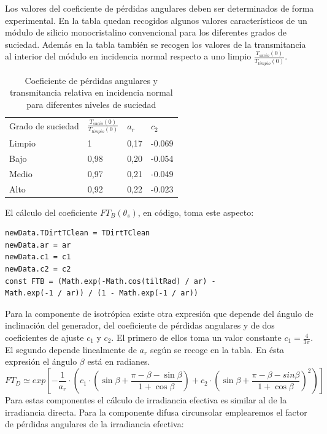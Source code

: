 Los valores del coeficiente de pérdidas angulares deben ser determinados de forma experimental. En la tabla quedan recogidos algunos valores característicos de un módulo de silicio monocristalino convencional para los diferentes grados de suciedad. Además en la tabla también se recogen los valores de la transmitancia al interior del módulo en incidencia normal respecto a uno limpio $\frac{T_{sucio}(0)}{T_{limpio}(0)}$.

\begin{table}[ht]
\centering
\begin{tabular}{llll}
\hline
Grado de suciedad & $\frac{T_{sucio}(0)}{T_{limpio}(0)}$ & $a_r$ & $c_2$ \\
Limpio            & 1                                                          & 0,17 & -0.069 \\
Bajo              & 0,98                                                       & 0,20 & -0.054 \\
Medio             & 0,97                                                       & 0,21 & -0.049 \\
Alto              & 0,92                                                       & 0,22 & -0.023
\end{tabular}
\label{tab:perdidas_suciedad}
\caption{Coeficiente de pérdidas angulares y transmitancia relativa en incidencia normal para diferentes niveles de suciedad }
\end{table}
El cálculo del coeficiente $FT_B(\theta_s)$, en código, toma este aspecto:
\begin{lstlisting}[style=ES6, caption={Cálculo del coeficiente $FT_B(\theta_s)$}]
newData.TDirtTClean = TDirtTClean
newData.ar = ar
newData.c1 = c1
newData.c2 = c2
const FTB = (Math.exp(-Math.cos(tiltRad) / ar) - 
Math.exp(-1 / ar)) / (1 - Math.exp(-1 / ar))
\end{lstlisting}


Para la componente de isotrópica existe otra expresión que depende del ángulo de inclinación del generador, del coeficiente de pérdidas angulares y de dos coeficientes de ajuste $c_1$ y $c_2$. El primero de ellos toma un valor constante $c_1=\frac{4}{3\pi}$. El segundo depende linealmente de $a_r$ según se recoge en la tabla. En ésta expresión el ángulo $\beta$ está en radianes.
\begin{equation}
FT_D \simeq exp[-\frac{1}{a_r}\cdot(c_1\cdot(\sin\beta + \frac{\pi-\beta-\sin\beta}{1+\cos\beta	})+c_2\cdot(\sin\beta + \frac{\pi-\beta-sin\beta}{1+\cos\beta})^2)]
\end{equation}
\newpage
Para estas componentes el cálculo de irradiancia efectiva es similar al de la irradiancia directa. Para la componente difusa circunsolar emplearemos el factor de pérdidas angulares de la irradiancia efectiva:

